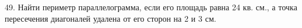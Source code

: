 49. Найти периметр параллелограмма, если его площадь равна 24 кв. см., а точка пересечения диагоналей удалена от его сторон на 2 и 3 см.\\
